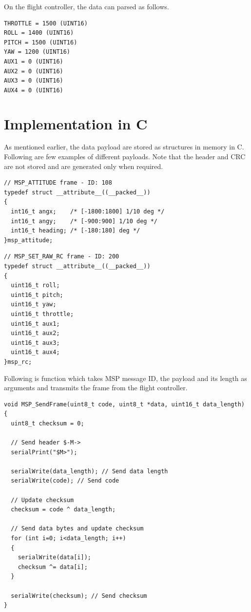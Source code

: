 \documentclass[a4paper,12pt,oneside]{book}
\begin{document}
\bigskip

On the flight controller, the data can parsed as follows.\\

\begin{verbatim}
THROTTLE = 1500 (UINT16)
ROLL = 1400 (UINT16)
PITCH = 1500 (UINT16)
YAW = 1200 (UINT16)
AUX1 = 0 (UINT16)
AUX2 = 0 (UINT16)
AUX3 = 0 (UINT16)
AUX4 = 0 (UINT16)
\end{verbatim}

\section{Implementation in C}
As mentioned earlier, the data payload are stored as structures in memory in C. Following are few examples of different payloads. Note that the header and CRC are not stored and are generated only when required.\\

\begin{verbatim}
// MSP_ATTITUDE frame - ID: 108
typedef struct __attribute__((__packed__))
{
  int16_t angx;    /* [-1800:1800] 1/10 deg */
  int16_t angy;    /* [-900:900] 1/10 deg */
  int16_t heading; /* [-180:180] deg */
}msp_attitude;
\end{verbatim}

\bigskip

\begin{verbatim}
// MSP_SET_RAW_RC frame - ID: 200
typedef struct __attribute__((__packed__))
{
  uint16_t roll;
  uint16_t pitch;
  uint16_t yaw;
  uint16_t throttle;
  uint16_t aux1;
  uint16_t aux2;
  uint16_t aux3;
  uint16_t aux4;
}msp_rc;
\end{verbatim}

\bigskip
Following is function which takes MSP message ID, the payload and its length as arguments and transmits the frame from the flight controller.\\

\begin{verbatim}
void MSP_SendFrame(uint8_t code, uint8_t *data, uint16_t data_length)
{
  uint8_t checksum = 0;

  // Send header $-M->
  serialPrint("$M>");
	
  serialWrite(data_length); // Send data length
  serialWrite(code); // Send code
	
  // Update checksum
  checksum = code ^ data_length;

  // Send data bytes and update checksum
  for (int i=0; i<data_length; i++)
  {
    serialWrite(data[i]);
    checksum ^= data[i];
  }
	
  serialWrite(checksum); // Send checksum
}
\end{verbatim}
\end{document}
